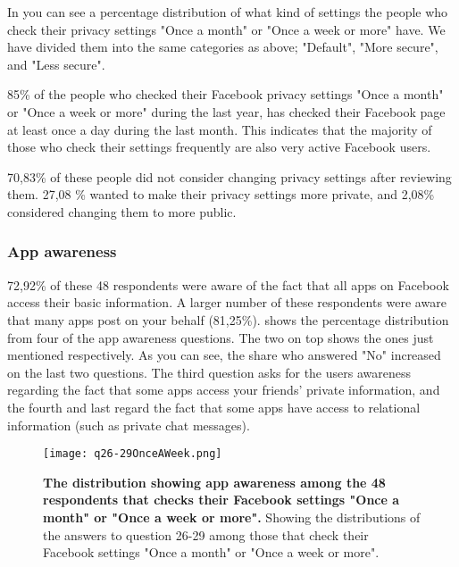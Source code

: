 In  you can see a percentage distribution of what kind of settings the people who check their privacy settings "Once a month" or "Once a week or more" have. We have divided them into the same categories as above; "Default", "More secure", and "Less secure".  

85\% of the people who checked their Facebook privacy settings "Once a month" or "Once a week or more" during the last year, has checked their Facebook page at least once a day during the last month. This indicates that the majority of those who check their settings frequently are also very active Facebook users. 

70,83\% of these people did not consider changing privacy settings after reviewing them. 27,08 \% wanted to make their privacy settings more private, and 2,08\% considered changing them to more public. 



\subsubsection{App awareness}
72,92\% of these 48 respondents were aware of the fact that all apps on Facebook access their basic information. A larger number of these respondents were aware that many apps post on your behalf (81,25\%).  shows the percentage distribution from four of the app awareness questions. The two on top shows the ones just mentioned respectively. As you can see, the share who answered "No" increased on the last two questions. The third question asks for the users awareness regarding the fact that some apps access your friends' private information, and the fourth and last regard the fact that some apps have access to relational information (such as private chat messages).  

\begin{figure}[h!]
\centering
\texttt{[image: q26-29OnceAWeek.png]}
\caption[The distribution showing app awareness among the 48 respondents that checks their Facebook settings "Once a month" or "Once a week or more"]{\textbf{The distribution showing app awareness among the 48 respondents that checks their Facebook settings "Once a month" or "Once a week or more".} Showing the distributions of the answers to question 26-29 among those that check their Facebook settings "Once a month" or "Once a week or more".} 
\label{fig:appawarenessonceaweek}
\end{figure}


